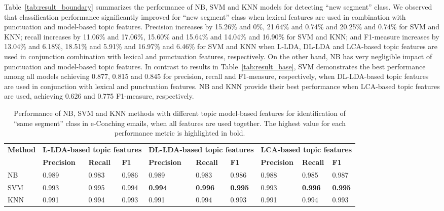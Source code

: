 \documentclass{amia}
\begin{document}
Table~\ref{tab:result_boundary} summarizes the performance of NB, SVM and KNN models for detecting ``new segment'' class. We observed that classification performance significantly improved for ``new segment'' class when lexical features are used in combination with punctuation and model-based topic features. Precision increases by 15.26\% and 0\%, 21.64\% and 0.74\% and 20.25\% and 0.74\% for SVM and KNN; recall increases by 11.06\% and 17.06\%, 15.60\% and 15.64\% and 14.04\% and 16.90\% for SVM and KNN; and F1-measure increases by 13.04\% and 6.18\%, 18.51\% and 5.91\% and 16.97\% and 6.46\% for SVM and KNN when L-LDA, DL-LDA and LCA-based topic features are used in conjunction combination with lexical and punctuation features, respectively. On the other hand, NB has very negligible impact of punctuation and model-based topic features. In contrast to results in Table~\ref{tab:result_base}, SVM demonstrates the best performance among all models achieving 0.877, 0.815 and 0.845 for precision, recall and F1-measure, respectively, when DL-LDA-based topic features are used in conjunction with lexical and punctuation features. NB and KNN provide their best performance when LCA-based topic features are used, achieving 0.626 and 0.775 F1-measure, respectively.\\ 
              

\begin{table}[ht]
\centering
\caption{Performance of NB, SVM and KNN methods with different topic model-based features for identification of ``same segment'' class in e-Coaching emails, when all features are used together. The highest value for each performance metric is highlighted in bold.}
\label{tab:result_not_boundary}
  \begin{tabular}{|l|l|l|l|l|l|l|l|l|l|}
  \hline
   \multirow{2}{*}{\textbf{Method}} & \multicolumn{3}{|c|}{\textbf{L-LDA-based topic features}} & \multicolumn{3}{|c|}{\textbf{DL-LDA-based topic features}}  & \multicolumn{3}{|c|}{\textbf{LCA-based topic features}} \\\cline{2-10} & \textbf{Precision}  & \textbf{Recall} & \textbf{F1} & \textbf{Precision}  & \textbf{Recall} & \textbf{F1} & \textbf{Precision}  & \textbf{Recall} & \textbf{F1}\\ \hline  
    
 NB & 0.989 & 0.983 & 0.986 & 0.989 & 0.983 & 0.986 & 0.988 & 0.985 & 0.987 \\ \hline
 SVM & 0.993 & 0.995 & 0.994 & \textbf{0.994} & \textbf{0.996} & \textbf{0.995} & 0.993 & \textbf{0.996} & \textbf{0.995} \\ \hline
 KNN & 0.991 & 0.994 & 0.993 & 0.991 & 0.994 & 0.993 & 0.991 & 0.994 & 0.993 \\ \hline
  \end{tabular}
\end{table}         
\end{document}

